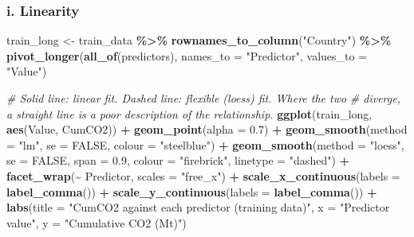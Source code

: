 \documentclass[
]{article}
\newenvironment{Shaded}{\begin{snugshade}}{\end{snugshade}}
\newcommand{\AttributeTok}[1]{\textcolor[rgb]{0.13,0.29,0.53}{#1}}
\newcommand{\CommentTok}[1]{\textcolor[rgb]{0.56,0.35,0.01}{\textit{#1}}}
\newcommand{\ConstantTok}[1]{\textcolor[rgb]{0.56,0.35,0.01}{#1}}
\newcommand{\FloatTok}[1]{\textcolor[rgb]{0.00,0.00,0.81}{#1}}
\newcommand{\FunctionTok}[1]{\textcolor[rgb]{0.13,0.29,0.53}{\textbf{#1}}}
\newcommand{\NormalTok}[1]{#1}
\newcommand{\OtherTok}[1]{\textcolor[rgb]{0.56,0.35,0.01}{#1}}
\newcommand{\SpecialCharTok}[1]{\textcolor[rgb]{0.81,0.36,0.00}{\textbf{#1}}}
\newcommand{\StringTok}[1]{\textcolor[rgb]{0.31,0.60,0.02}{#1}}
\begin{document}
\subsubsection{i. Linearity}\label{i.-linearity}

\begin{Shaded}
\begin{Highlighting}[]
\NormalTok{train\_long }\OtherTok{\textless{}{-}}\NormalTok{ train\_data }\SpecialCharTok{\%\textgreater{}\%}
  \FunctionTok{rownames\_to\_column}\NormalTok{(}\StringTok{"Country"}\NormalTok{) }\SpecialCharTok{\%\textgreater{}\%}
  \FunctionTok{pivot\_longer}\NormalTok{(}\FunctionTok{all\_of}\NormalTok{(predictors), }\AttributeTok{names\_to =} \StringTok{"Predictor"}\NormalTok{,}
               \AttributeTok{values\_to =} \StringTok{"Value"}\NormalTok{)}

\CommentTok{\# Solid line: linear fit. Dashed line: flexible (loess) fit. Where the two}
\CommentTok{\# diverge, a straight line is a poor description of the relationship.}
\FunctionTok{ggplot}\NormalTok{(train\_long, }\FunctionTok{aes}\NormalTok{(Value, CumCO2)) }\SpecialCharTok{+}
  \FunctionTok{geom\_point}\NormalTok{(}\AttributeTok{alpha =} \FloatTok{0.7}\NormalTok{) }\SpecialCharTok{+}
  \FunctionTok{geom\_smooth}\NormalTok{(}\AttributeTok{method =} \StringTok{"lm"}\NormalTok{, }\AttributeTok{se =} \ConstantTok{FALSE}\NormalTok{, }\AttributeTok{colour =} \StringTok{"steelblue"}\NormalTok{) }\SpecialCharTok{+}
  \FunctionTok{geom\_smooth}\NormalTok{(}\AttributeTok{method =} \StringTok{"loess"}\NormalTok{, }\AttributeTok{se =} \ConstantTok{FALSE}\NormalTok{, }\AttributeTok{span =} \FloatTok{0.9}\NormalTok{,}
              \AttributeTok{colour =} \StringTok{"firebrick"}\NormalTok{, }\AttributeTok{linetype =} \StringTok{"dashed"}\NormalTok{) }\SpecialCharTok{+}
  \FunctionTok{facet\_wrap}\NormalTok{(}\SpecialCharTok{\textasciitilde{}}\NormalTok{ Predictor, }\AttributeTok{scales =} \StringTok{"free\_x"}\NormalTok{) }\SpecialCharTok{+}
  \FunctionTok{scale\_x\_continuous}\NormalTok{(}\AttributeTok{labels =} \FunctionTok{label\_comma}\NormalTok{()) }\SpecialCharTok{+}
  \FunctionTok{scale\_y\_continuous}\NormalTok{(}\AttributeTok{labels =} \FunctionTok{label\_comma}\NormalTok{()) }\SpecialCharTok{+}
  \FunctionTok{labs}\NormalTok{(}\AttributeTok{title =} \StringTok{"CumCO2 against each predictor (training data)"}\NormalTok{,}
       \AttributeTok{x =} \StringTok{"Predictor value"}\NormalTok{, }\AttributeTok{y =} \StringTok{"Cumulative CO2 (Mt)"}\NormalTok{)}
\end{Highlighting}
\end{Shaded}
\end{document}
